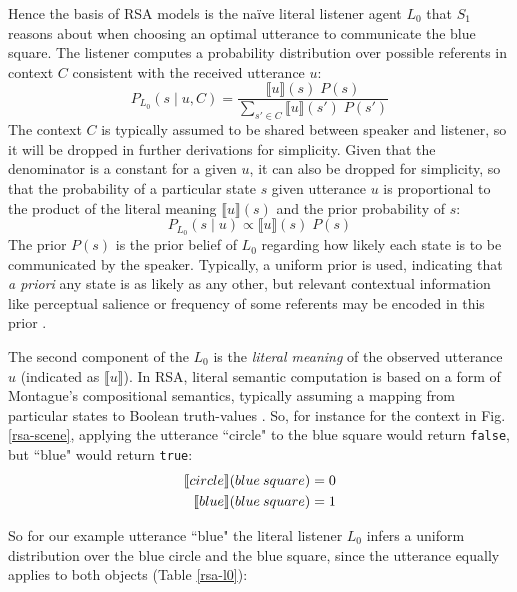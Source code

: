 Hence the basis of RSA models is the na\"ive literal listener agent $L_0$ that $S_1$ reasons about when choosing an optimal utterance to communicate the blue square. The listener computes a probability distribution over possible referents in context $C$  consistent with the received utterance $u$: %
\begin{equation}
P_{L_0}(s \mid u, C) = \frac{\llbracket u \rrbracket (s) \; P(s)}{\sum_{s' \in C} \llbracket u \rrbracket (s') \; P(s')}
\end{equation}
The context $C$ is typically assumed to be shared between speaker and listener, so it will be dropped in further derivations for simplicity. Given that the denominator is a constant for a given $u$, it can also be dropped for simplicity, so that the probability of a particular state $s$ given utterance $u$ is proportional to the product of the literal meaning $\llbracket u \rrbracket (s)$ and the prior probability of $s$: 
\begin{equation}
P_{L_0}(s \mid u) \propto \llbracket u \rrbracket (s) \; P(s)
\end{equation}
The prior $P(s)$ is the prior belief of $L_0$ regarding how likely each state is to be communicated by the speaker. Typically, a uniform prior is used, indicating that \emph{a priori} any state is as likely as any other, but relevant contextual information like perceptual salience or frequency of some referents may be encoded in this prior \parencite{frank2012predicting}.

The second component of the $L_0$ is the \emph{literal meaning} of the observed utterance $u$ (indicated as $\llbracket u \rrbracket$). In RSA, literal semantic computation is based on a form of Montague’s compositional semantics, typically assuming a mapping from particular states to Boolean truth-values \parencite{montague1973proper} \parencite[but see e.g.][for alternative approaches]{degen2020redundancy}. 
So, for instance for the context in Fig. \ref{rsa-scene}, applying the utterance ``circle" to the blue square would return \texttt{false}, but ``blue" would return \texttt{true}:
\begin{align}
\llbracket circle \rrbracket (blue \: square) = 0 \notag \\
\llbracket blue \rrbracket (blue\: square) = 1
\end{align}
  
So for our example utterance ``blue" the literal listener $L_0$ infers a uniform distribution over the blue circle and the blue square, since the utterance equally applies to both objects (Table \ref{rsa-l0}):

